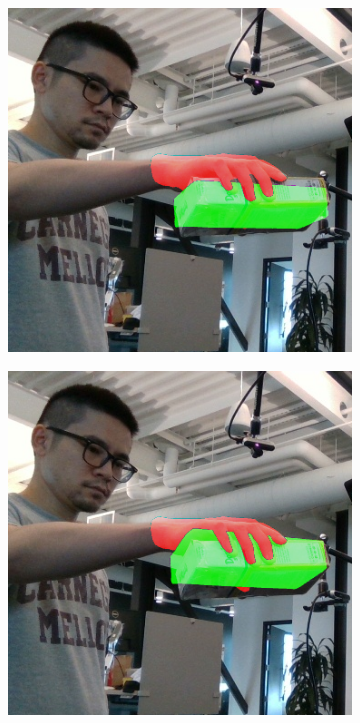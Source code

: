 \begin{figure}[h!]
\begin{subfigure}[b]{0.16\linewidth}
  \end{subfigure}
    \begin{subfigure}[b]{0.16\linewidth}
    \includegraphics[width=0.98\linewidth]{figs/5319_3}
  \end{subfigure}
    \begin{subfigure}[b]{0.16\linewidth}
    \includegraphics[width=0.98\linewidth]{figs/5319_4}
  \end{subfigure}  
  \vspace{0.2cm}
  

\end{figure}
